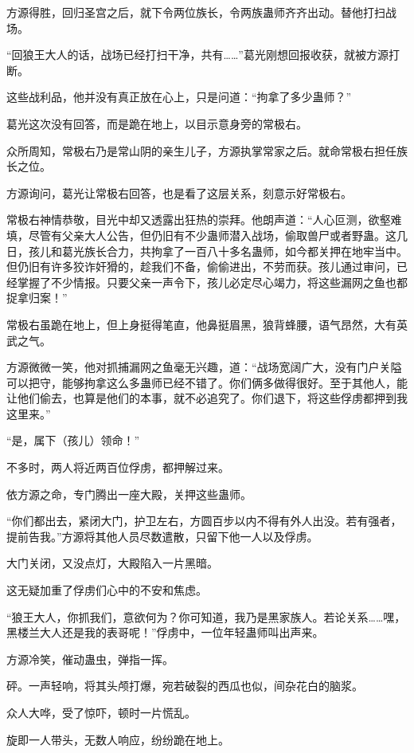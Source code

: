 \begin{this_body}
方源得胜，回归圣宫之后，就下令两位族长，令两族蛊师齐齐出动。替他打扫战场。

“回狼王大人的话，战场已经打扫干净，共有……”葛光刚想回报收获，就被方源打断。

这些战利品，他并没有真正放在心上，只是问道：“拘拿了多少蛊师？”

葛光这次没有回答，而是跪在地上，以目示意身旁的常极右。

众所周知，常极右乃是常山阴的亲生儿子，方源执掌常家之后。就命常极右担任族长之位。

方源询问，葛光让常极右回答，也是看了这层关系，刻意示好常极右。

常极右神情恭敬，目光中却又透露出狂热的崇拜。他朗声道：“人心叵测，欲壑难填，尽管有父亲大人公告，但仍旧有不少蛊师潜入战场，偷取兽尸或者野蛊。这几日，孩儿和葛光族长合力，共拘拿了一百八十多名蛊师，如今都关押在地牢当中。但仍旧有许多狡诈奸猾的，趁我们不备，偷偷进出，不劳而获。孩儿通过审问，已经掌握了不少情报。只要父亲一声令下，孩儿必定尽心竭力，将这些漏网之鱼也都捉拿归案！”

常极右虽跪在地上，但上身挺得笔直，他鼻挺眉黑，狼背蜂腰，语气昂然，大有英武之气。

方源微微一笑，他对抓捕漏网之鱼毫无兴趣，道：“战场宽阔广大，没有门户关隘可以把守，能够拘拿这么多蛊师已经不错了。你们俩多做得很好。至于其他人，能让他们偷去，也算是他们的本事，就不必追究了。你们退下，将这些俘虏都押到我这里来。”

“是，属下（孩儿）领命！”

不多时，两人将近两百位俘虏，都押解过来。

依方源之命，专门腾出一座大殿，关押这些蛊师。

“你们都出去，紧闭大门，护卫左右，方圆百步以内不得有外人出没。若有强者，提前告我。”方源将其他人员尽数遣散，只留下他一人以及俘虏。

大门关闭，又没点灯，大殿陷入一片黑暗。

这无疑加重了俘虏们心中的不安和焦虑。

“狼王大人，你抓我们，意欲何为？你可知道，我乃是黑家族人。若论关系……嘿，黑楼兰大人还是我的表哥呢！”俘虏中，一位年轻蛊师叫出声来。

方源冷笑，催动蛊虫，弹指一挥。

砰。一声轻响，将其头颅打爆，宛若破裂的西瓜也似，间杂花白的脑浆。

众人大哗，受了惊吓，顿时一片慌乱。

旋即一人带头，无数人响应，纷纷跪在地上。


\end{this_body}
